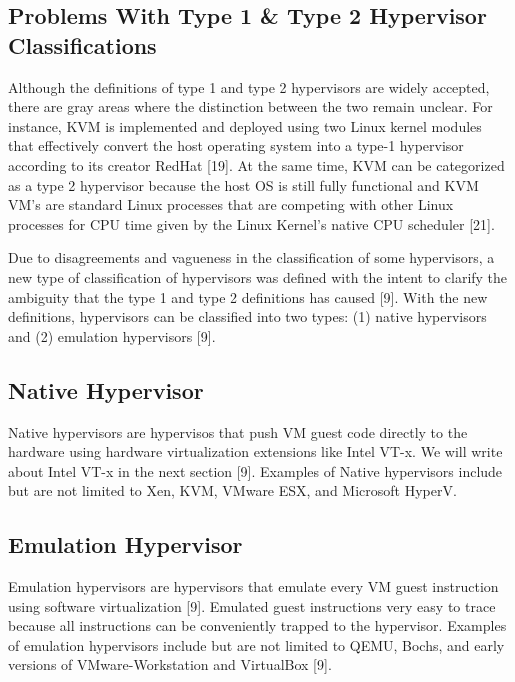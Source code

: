 \documentclass{report}
\begin{document}
\begin{spacing}{1.5}
\subsection{Problems With Type 1 \& Type 2 Hypervisor Classifications}

{\large
Although the definitions of type 1 and type 2 hypervisors are widely accepted, there are gray areas where the distinction between the two remain unclear. For instance, KVM is implemented and deployed using two Linux kernel modules that effectively convert the host operating system into a type-1 hypervisor according to its creator RedHat [19]. At the same time, KVM can be categorized as a type 2 hypervisor because the host OS is still fully functional and KVM VM's are standard Linux processes that are competing with other Linux processes for CPU time given by the Linux Kernel's native CPU scheduler [21].
\newline
}


{\large
Due to disagreements and vagueness in the classification of some hypervisors, a new type of classification of hypervisors was defined with the intent to clarify the ambiguity that the type 1 and type 2 definitions has caused [9]. With the new definitions, hypervisors can be classified into two types: (1) native hypervisors and (2) emulation hypervisors [9].
\newline
}

\subsection{Native Hypervisor}

{\large
Native hypervisors are hypervisos that push VM guest code directly to the hardware using hardware virtualization extensions like Intel VT-x. We will write about Intel VT-x in the next section [9]. Examples of Native hypervisors include but are not limited to Xen, KVM, VMware ESX, and Microsoft HyperV.
\newline
}


\subsection{Emulation Hypervisor}
{\large
Emulation hypervisors are hypervisors that emulate every VM guest instruction using software virtualization [9]. Emulated guest instructions very easy to trace because all instructions can be conveniently trapped to the hypervisor. Examples of emulation hypervisors include but are not limited to  QEMU, Bochs, and early versions of VMware-Workstation and VirtualBox [9].
\newline
}








\end{spacing}
\end{document}
